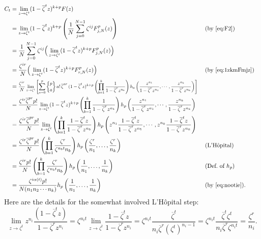 \documentclass[10pt,reqno]{amsart}
\newcommand{\0}{\color{lightgray}0}
\newcommand{\stirling}[2]{\genfrac\{\}{0pt}{}{#1}{#2}}
\renewcommand\>{\rangle}
\newcommand\<{\langle}
\theoremstyle{plain}
\theoremstyle{definition}
\begin{document}
\begin{align*}
C_t
&= \lim_{z \to \zeta^t} (1-\overline{\zeta}^t z)^{k+p} F(z) \nonumber \\
&=\lim_{z \to \zeta^t} (1-\overline{\zeta}^t z)^{k+p} \left(  \frac{1}{N} \sum_{j=0}^{N-1} \zeta^{ij} F^p_{j,N}(z) \right) && \text{(by \eqref{eq:F2})} \nonumber \\
&= \frac{1}{N}   \sum_{j=0}^{N-1} \zeta^{ij}  \Big(\lim_{z \to \zeta^t} (1-\overline{\zeta}^t z)^{k+p} F^p_{j,N}(z) \Big)\nonumber  \\
&= \frac{\zeta^{ir}}{N}   \Big(\lim_{z \to \zeta^t} (1-\overline{\zeta}^t z)^{k+p} F_{r,N}^p(z) \Big)  &&\text{(by \eqref{eq:1zkmFmjz})} \nonumber \\
&= \scalebox{0.8}{$\displaystyle\frac{\zeta^{ir}}{N}\lim_{z \to \zeta^t}\left[    \sum_{a=0}^p \stirling{p}{a} \, a! \,\overline{\zeta}^{ar}\,(1 - \overline{\zeta}^t z)^{k+p}
\left( \prod_{b=1}^k \frac{1}{1 - \overline{\zeta}^r z^{n_b}}  \right) h_a \left( \frac{z^{n_1}}{1 - \overline{\zeta}^r z^{n_1}}, \cdots, \frac{z^{n_k}}{1 - \overline{\zeta}^r z^{n_k}} \right) \right]$ } \\
&= \scalebox{0.925}{$\displaystyle\frac{\zeta^{ir} \overline{\zeta}^{pr}p!}{N}\lim_{z \to \zeta^t} (1 - \overline{\zeta}^t z)^{k+p} \left( \prod_{b=1}^k \frac{1}{1 - \overline{\zeta}^r z^{n_b}} \right) h_p \left( \frac{z^{n_1}}{1 - \overline{\zeta}^r z^{n_1}}, \cdots, \frac{z^{n_k}}{1 - \overline{\zeta}^r z^{n_k}} \right) $} \\
&= \frac{\zeta^{ir} \overline{\zeta}^{pr}p!}{N}\lim_{z \to \zeta^t} \left( \prod_{b=1}^k \frac{1 - \overline{\zeta}^t z}{1 - \overline{\zeta}^r z^{n_b}} \right) h_p \left( z^{n_1}\frac{1 - \overline{\zeta}^t z}{1 - \overline{\zeta}^r z^{n_1}}, \cdots, z^{n_k}\frac{1-\overline{\zeta}^t z}{1 - \overline{\zeta}^r z^{n_k}} \right) \\
&= \frac{\zeta^{ir} \overline{\zeta}^{pr}p!}{N}\left( \prod_{b=1}^k \frac{\zeta^r}{\zeta^{n_b t}n_b}  \right) h_p \left( \frac{\zeta^r}{n_1},\ldots, \frac{\zeta^r}{n_k} \right)
&& (\text{L'H\^opital}) \nonumber \\
&= \frac{\zeta^{ir}  p!}{N}\left( \prod_{b=1}^k \frac{\zeta^r}{\zeta^{n_b t}n_b}  \right) h_p \left( \frac{1}{n_1},\ldots, \frac{1}{n_k} \right) \nonumber 
&& (\text{Def.~of $h_p$})\\
&= \frac{\zeta^{i \alpha(t)}  p!}{N(n_1 n_2 \cdots n_k)} h_p \left( \frac{1}{n_1},\ldots, \frac{1}{n_k} \right) \nonumber 
&& (\text{by \eqref{eq:nootie}}).
\end{align*}
Here are the details for the somewhat involved L'H\^opital step:
\begin{equation*}
\lim_{z \to \zeta^t}z^{n_i}  \frac{(1 - \overline{\zeta}^t z)}{1 - \overline{\zeta}^r z^{n_i}}
= \zeta^{n_i t} \lim_{z \to \zeta^t} \frac{1 - \overline{\zeta}^t z}{1 - \overline{\zeta}^r z^{n_i}} 
= \zeta^{n_i t} \frac{\overline{\zeta}^t}{n_i \overline{\zeta}^r (\zeta^t)^{n_i-1}} 
= \zeta^{n_i t} \frac{\overline{\zeta}^t \zeta^t}{n_i \overline{\zeta}^r \zeta^{n_i t}} 
= \frac{\zeta^r}{n_i}.
\end{equation*}
\end{document}
